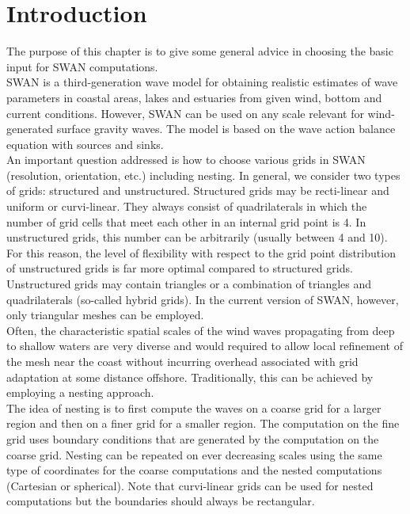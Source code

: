 \documentclass[12pt]{book}
\begin{document}
\section{Introduction}
The purpose of this chapter is to give some general advice in choosing the basic input for SWAN
computations.
\\[2ex]
\noindent
SWAN is a third-generation wave model for obtaining realistic estimates of wave parameters in coastal areas, lakes and
estuaries from given wind, bottom and current conditions. However, SWAN can be used on any scale relevant for
wind-generated surface gravity waves. The model is based on the wave action balance equation with sources and sinks.
\\[2ex]
\noindent
An important question addressed is how to choose various grids in SWAN (resolution, orientation,
etc.) including nesting.
In general, we consider two types of grids: structured and unstructured. Structured grids may be recti-linear and
uniform or curvi-linear. They always consist of quadrilaterals in which the number of grid cells that meet each
other in an internal grid point is 4. In unstructured grids, this number can be arbitrarily (usually between 4 and 10).
For this reason, the level of flexibility with respect to the grid point distribution of unstructured grids
is far more optimal compared to structured grids.
Unstructured grids may contain triangles or a combination of triangles and quadrilaterals (so-called hybrid grids).
In the current version of SWAN, however, only triangular meshes can be employed.
\\[2ex]
\noindent
Often, the characteristic spatial scales of the wind waves propagating from deep to shallow waters are very
diverse and would required to allow local refinement of the mesh near the coast without incurring
overhead associated with grid adaptation at some distance offshore. Traditionally, this can be achieved by employing
a nesting approach.
\\[2ex]
\noindent
The idea of nesting is to first
compute the waves on a coarse grid for a larger region and then on a finer grid for a smaller
region. The computation on the fine grid uses boundary conditions that are generated by the
computation on the coarse grid. Nesting can be repeated on ever decreasing scales using the
same type of coordinates for the coarse computations and the nested computations (Cartesian or
spherical). Note that curvi-linear grids can be used for nested computations but the boundaries
should always be rectangular.
\\[2ex]
\end{document}
